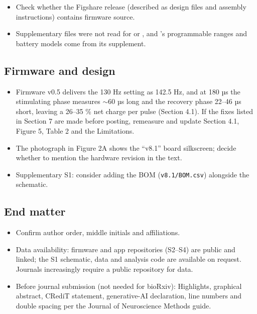 \begin{itemize}
\item Check whether the \citet{pinnell2018} Figshare release (described as design files and assembly instructions) contains firmware source.
\item Supplementary files were not read for \citet{burton2021} or \citet{shen2026}, and \citet{paulat2026}'s programmable ranges and battery models come from its supplement.
\end{itemize}

\subsection{Firmware and design}\label{notes-firmware}

\begin{itemize}
\item Firmware v0.5 delivers the 130 Hz setting as 142.5 Hz, and at 180 µs the stimulating phase measures $\sim$60 µs long and the recovery phase 22--46 µs short, leaving a 26--35 \% net charge per pulse (Section 4.1). If the fixes listed in Section 7 are made before posting, remeasure and update Section 4.1, Figure 5, Table 2 and the Limitations.
\item The photograph in Figure 2A shows the ``v8.1'' board silkscreen; decide whether to mention the hardware revision in the text.
\item Supplementary S1: consider adding the BOM (\texttt{v8.1/BOM.csv}) alongside the schematic.
\end{itemize}

\subsection{End matter}\label{notes-end-matter}

\begin{itemize}
\item Confirm author order, middle initials and affiliations.
\item Data availability: firmware and app repositories (S2--S4) are public and linked; the S1 schematic, data and analysis code are available on request. Journals increasingly require a public repository for data.
\item Before journal submission (not needed for bioRxiv): Highlights, graphical abstract, CRediT statement, generative-AI declaration, line numbers and double spacing per the Journal of Neuroscience Methods guide.
\end{itemize}
